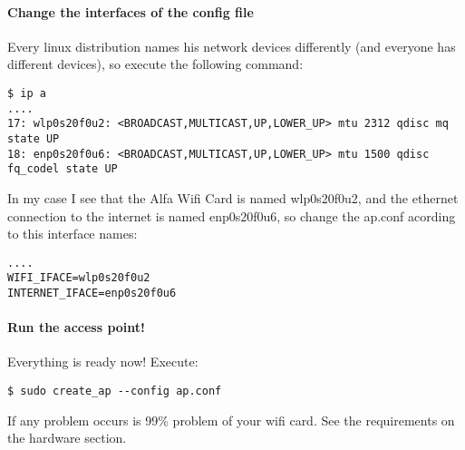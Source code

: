 \paragraph{Change the interfaces of the config
file}\label{change-the-interfaces-of-the-config-file}

Every linux distribution names his network devices differently (and
everyone has different devices), so execute the following command:

\begin{verbatim}
$ ip a
....
17: wlp0s20f0u2: <BROADCAST,MULTICAST,UP,LOWER_UP> mtu 2312 qdisc mq state UP 
18: enp0s20f0u6: <BROADCAST,MULTICAST,UP,LOWER_UP> mtu 1500 qdisc fq_codel state UP 

\end{verbatim}

In my case I see that the Alfa Wifi Card is named wlp0s20f0u2, and the
ethernet connection to the internet is named enp0s20f0u6, so change the
ap.conf acording to this interface names:

\begin{verbatim}
....
WIFI_IFACE=wlp0s20f0u2
INTERNET_IFACE=enp0s20f0u6
\end{verbatim}

\paragraph{Run the access point!}\label{run-the-access-point}

Everything is ready now! Execute:

\begin{verbatim}
$ sudo create_ap --config ap.conf
\end{verbatim}

If any problem occurs is 99\% problem of your wifi card. See the
requirements on the hardware section.
